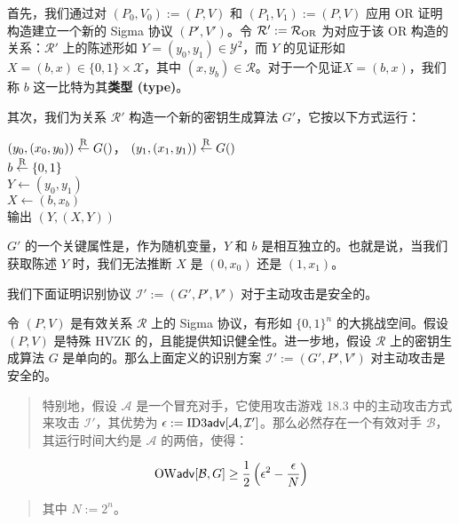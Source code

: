 首先，我们通过对 $(P_0,V_0):=(P,V)$ 和 $(P_1,V_1):=(P,V)$ 应用 OR 证明构造建立一个新的 Sigma 协议 $(P',V')$。令 $\mathcal{R}':=\mathcal{R}_{\rm OR}$ 为对应于该 OR 构造的关系：$\mathcal{R}'$ 上的陈述形如 $Y=(y_0,y_1)\in\mathcal{Y}^2$，而 $Y$ 的见证形如 $X=(b,x)\in\{0,1\}\times\mathcal{X}$，其中 $(x,y_b)\in\mathcal{R}$。对于一个见证$X = (b,x)$，我们称 $b$ 这一比特为其\textbf{类型 (type)}。

其次，我们为关系 $\mathcal{R}'$ 构造一个新的密钥生成算法 $G'$，它按以下方式运行：

\vspace{8pt}

\hspace*{40pt} $(y_0,(x_0,y_0))\overset{\rm R}\leftarrow G()$，
               $(y_1,(x_1,y_1))\overset{\rm R}\leftarrow G()$\\
\hspace*{62pt} $b\overset{\rm R}\leftarrow\{0,1\}$\\
\hspace*{62pt} $Y\leftarrow(y_0,y_1)$\\
\hspace*{62pt} $X\leftarrow(b,x_b)$\\
\hspace*{62pt} 输出 $(Y,(X,Y))$

\vspace{8pt}

\noindent
$G'$ 的一个关键属性是，作为随机变量，$Y$ 和 $b$ 是相互独立的。也就是说，当我们获取陈述 $Y$ 时，我们无法推断 $X$ 是 $(0,x_0)$ 还是 $(1,x_1)$。

我们下面证明识别协议 $\mathcal{I}':=(G',P',V')$ 对于主动攻击是安全的。

\begin{theorem}\label{theo:19-22}
令 $(P,V)$ 是有效关系 $\mathcal{R}$ 上的 Sigma 协议，有形如 $\{0,1\}^n$ 的大挑战空间。假设 $(P,V)$ 是特殊 HVZK 的，且能提供知识健全性。进一步地，假设 $\mathcal{R}$ 上的密钥生成算法 $G$ 是单向的。那么上面定义的识别方案 $\mathcal{I}':=(G',P',V')$ 对主动攻击是安全的。
\begin{quote}
特别地，假设 $\mathcal{A}$ 是一个冒充对手，它使用攻击游戏 18.3 中的主动攻击方式来攻击 $\mathcal{I}'$，其优势为 $\epsilon:={\rm ID3\mathsf{adv}}[\mathcal{A},\mathcal{I}']$。那么必然存在一个有效对手 $\mathcal{B}$，其运行时间大约是 $\mathcal{A}$ 的两倍，使得：
\end{quote}
$$
{\rm OW\mathsf{adv}}[\mathcal{B},G]\geq\frac{1}{2}\left(\epsilon^2-\frac{\epsilon}{N}\right)
$$
\begin{quote}
其中 $N:=2^n$。
\end{quote}
\end{theorem}

